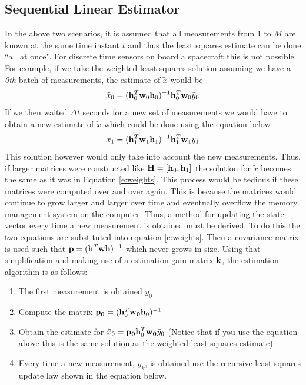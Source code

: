 \subsection{Sequential Linear Estimator}

In the above two scenarios, it is assumed that all measurements from 1
to $M$ are known at the same time instant $t$ and thus the least squares estimate can be done ``all
at once". For discrete time sensors on board a spacecraft this is
not possible. For example, if we take the weighted least squares
solution assuming we have a {\it 0th} batch of measurements, the
estimate of $\tilde{x}$ would be
\begin{equation}
  \tilde{x}_0 = ({\bf h}_0^T{\bf w}_0{\bf h}_0)^{-1}{\bf h}_0^T{\bf
    w}_0\bar{y}_0
\end{equation}
If we then waited $\Delta t$ seconds for a new set of measurements we
would have to obtain a new estimate of $\tilde{x}$ which could be done
using the equation below
\begin{equation}
  \tilde{x}_1 = ({\bf h}_1^T{\bf w}_1{\bf h}_1)^{-1}{\bf h}_1^T{\bf
    w}_1\bar{y}_1
\end{equation}
This solution however would only take into account the new
measurements. Thus, if larger matrices were constructed like
${\bf H} = [{\bf h}_0,{\bf h}_1]$ the solution for $\tilde{x}$ becomes
the same as it was in Equation \ref{e:weights}. This process would be
tedious if these matrices were computed over and over again. This is
because the matrices would continue to grow larger and larger over
time and eventually overflow the memory management system on the
computer. Thus, a method for updating the state vector every time
a new measurement is obtained must be derived. To do this the two
equations are substituted into equation \ref{e:weights}. Then a
covariance matrix is used such that ${\bf p} = ({\bf h}^T{\bf w}{\bf h})^{-1}$ 
which never grows in size. Using that simplification and making use of
a estimation gain matrix ${\bf k}$, the estimation algorithm is as follows:
\begin{enumerate}[itemsep=-5pt]
    \item The first measurement is obtained $\bar{y}_0$
    \item Compute the matrix ${\bf p_0} = ({\bf h}_0^T{\bf w_0}{\bf h}_0)^{-1}$
    \item Obtain the estimate for $\tilde{x}_0 = {\bf p_0}{\bf
      h}_0^T{\bf w_0}\bar{y}_0$ (Notice that if you use the equation
      above this is the same solution as the weighted least squares estimate)
    \item Every time a new measurement, $\bar{y}_k$, is obtained use the recursive least squares update law shown in the equation below.  
\end{enumerate}
